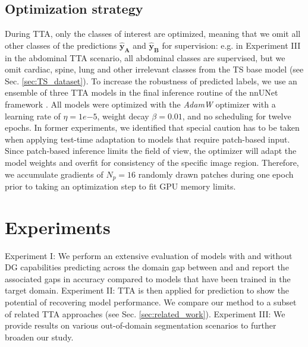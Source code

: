     \subsection{Optimization strategy}
        During TTA, only the classes of interest are optimized, meaning that we omit all other classes of the predictions $\mathbf{\hat{y}_A}$ and $\mathbf{\hat{y}_B}$ for supervision: e.g. in Experiment III in the abdominal TTA scenario, all abdominal classes are supervised, but we omit cardiac, spine, lung and other irrelevant classes from the TS base model (see Sec. \ref{sec:TS_dataset}).
        To increase the robustness of predicted labels, we use an ensemble of three TTA models in the final inference routine of the nnUNet framework \cite{isensee2021nnu}.
        All models were optimized with the \emph{AdamW} optimizer
        with a learning rate of  $\eta=1e{-5}$, weight decay $\beta=0.01$, and no scheduling for twelve epochs.
        In former experiments, we identified that special caution has to be taken when applying test-time adaptation to models that require patch-based input. Since patch-based inference limits the field of view, the optimizer will adapt the model weights and overfit for consistency of the specific image region. Therefore, we accumulate gradients of $N_p = 16$ randomly drawn patches during one epoch prior to taking an optimization step to fit GPU memory limits.

\section{Experiments}
    Experiment I: We perform an extensive evaluation of models with and without DG capabilities predicting across the domain gap between  and  and report the associated gaps in accuracy compared to models that have been trained in the target domain.
    Experiment II: TTA is then applied for  prediction to show the potential of recovering model performance. We compare our method to a subset of related TTA approaches (see Sec. \ref{sec:related_work}).
    Experiment III: We provide results on various out-of-domain segmentation scenarios to further broaden our study.

